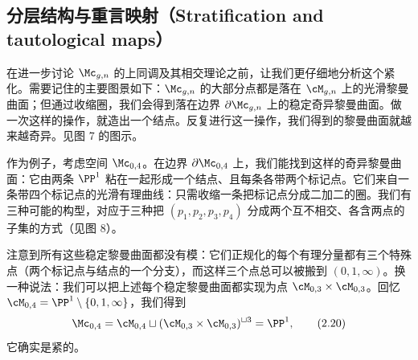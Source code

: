 
\subsection{分层结构与重言映射（Stratification and tautological maps）}

在进一步讨论 $\Mc_{g,n}$ 的上同调及其相交理论之前，让我们更仔细地分析这个紧化。需要记住的主要图景如下：$\Mc_{g,n}$ 的大部分点都是落在 $\cM_{g,n}$ 上的光滑黎曼曲面；但通过收缩圈，我们会得到落在边界 $\partial\Mc_{g,n}$ 上的稳定奇异黎曼曲面。做一次这样的操作，就造出一个结点。反复进行这一操作，我们得到的黎曼曲面就越来越奇异。见图 7 的图示。

作为例子，考虑空间 $\Mc_{0,4}$。在边界 $\partial\Mc_{0,4}$ 上，我们能找到这样的奇异黎曼曲面：它由两条 $\PP^1$ 粘在一起形成一个结点、且每条各带两个标记点。它们来自一条带四个标记点的光滑有理曲线：只需收缩一条把标记点分成二加二的圈。我们有三种可能的构型，对应于三种把 $(p_1,p_2,p_3,p_4)$ 分成两个互不相交、各含两点的子集的方式（见图 8）。


注意到所有这些稳定黎曼曲面都没有模：它们正规化的每个有理分量都有三个特殊点（两个标记点与结点的一个分支），而这样三个点总可以被搬到 $(0,1,\infty)$。换一种说法：我们可以把上述每个稳定黎曼曲面都实现为点 $\cM_{0,3}\times\cM_{0,3}$。回忆 $\cM_{0,4}=\PP^1\setminus\{0,1,\infty\}$，我们得到
\begin{equation}
  \Mc_{0,4}=\cM_{0,4}\sqcup(\cM_{0,3}\times\cM_{0,3})^{\sqcup 3}=\PP^1,
  \tag{2.20}
\end{equation}
它确实是紧的。

